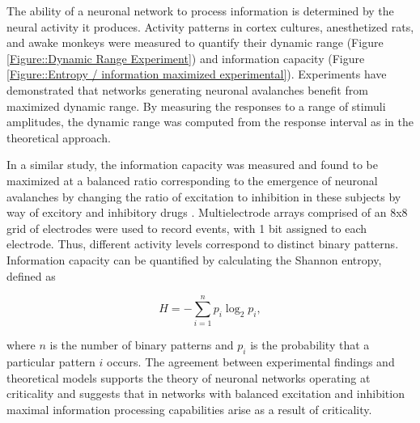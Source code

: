 \documentclass[12pt]{article}
\begin{document}
The ability of a neuronal network to process information is determined by the neural activity it produces. Activity patterns in cortex cultures, anesthetized rats, and awake monkeys were measured to quantify their dynamic range (Figure \ref{Figure::Dynamic Range Experiment}) and information capacity (Figure \ref{Figure::Entropy / information maximized experimental}). Experiments have demonstrated that networks generating neuronal avalanches benefit from maximized dynamic range\cite{Shew2009b}. By measuring the responses to a range of stimuli amplitudes, the dynamic range was computed from the response interval as in the theoretical approach.
   
In a similar study, the information capacity was measured and found to be maximized at a balanced ratio corresponding to the emergence of neuronal avalanches by changing the ratio of excitation to inhibition in these subjects by way of excitory and inhibitory drugs \cite{Shew2011a}. Multielectrode arrays comprised of an 8x8 grid of electrodes were used to record events, with 1 bit assigned to each electrode. Thus, different activity levels correspond to distinct binary patterns. Information capacity can be quantified by calculating the Shannon entropy, defined as

\begin{equation}
H = - \sum^{n}_{i=1}p_{i}\log_{2}p_{i},
\end{equation}

\noindent where $n$ is the number of binary patterns and $ p_{i} $ is the probability that a particular pattern $i$ occurs. The agreement between experimental findings and theoretical models supports the theory of neuronal networks operating at criticality and suggests that in networks with balanced excitation and inhibition maximal information processing capabilities arise as a result of criticality. 
\end{document}
